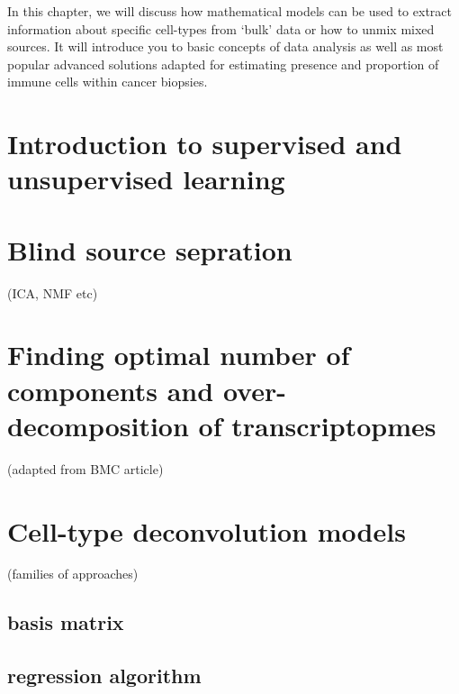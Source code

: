 \documentclass[12pt,]{book}
\theoremstyle{definition}
\theoremstyle{definition}
\theoremstyle{definition}
\theoremstyle{remark}
\begin{document}
In this chapter, we will discuss how mathematical models can be used to
extract information about specific cell-types from `bulk' data or how to
unmix mixed sources. It will introduce you to basic concepts of data
analysis as well as most popular advanced solutions adapted for
estimating presence and proportion of immune cells within cancer
biopsies.

\hypertarget{introduction-to-supervised-and-unsupervised-learning}{%
\section{Introduction to supervised and unsupervised
learning}\label{introduction-to-supervised-and-unsupervised-learning}}

\hypertarget{blind-source-sepration}{%
\section{Blind source sepration}\label{blind-source-sepration}}

(ICA, NMF etc)

\hypertarget{finding-optimal-number-of-components-and-over-decomposition-of-transcriptopmes}{%
\section{Finding optimal number of components and over-decomposition of
transcriptopmes}\label{finding-optimal-number-of-components-and-over-decomposition-of-transcriptopmes}}

(adapted from BMC article)


\hypertarget{cell-type-deconvolution-models}{%
\section{Cell-type deconvolution
models}\label{cell-type-deconvolution-models}}

(families of approaches)

\hypertarget{basis-matrix}{%
\subsection{basis matrix}\label{basis-matrix}}

\hypertarget{regression-algorithm}{%
\subsection{regression algorithm}\label{regression-algorithm}}
\end{document}
